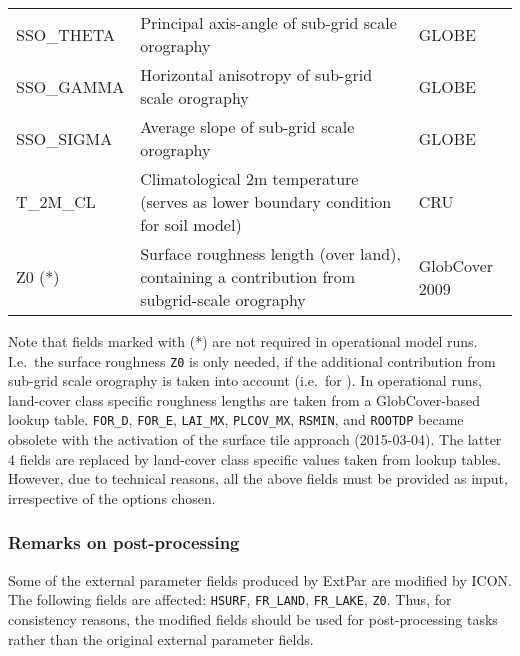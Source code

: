 \begin{longtable}{p{2.5cm}p{8.5cm}p{3.3cm}}
  SSO\_THETA                            & Principal axis-angle of sub-grid scale orography &          GLOBE           \\
  SSO\_GAMMA                            & Horizontal anisotropy of sub-grid scale orography &         GLOBE           \\
  SSO\_SIGMA                            & Average slope of sub-grid scale orography       &           GLOBE           \\
  T\_2M\_CL                             & Climatological 2m temperature (serves as lower boundary condition for soil model)  &  CRU \\
  Z0 (*)                                & Surface roughness length (over land), containing a contribution from subgrid-scale orography  & GlobCover 2009    \\                        
  \bottomrule
\end{longtable}

Note that fields marked with (*) are not required in operational model runs. I.e.\ the surface roughness \texttt{Z0} is only needed, 
if the additional contribution from sub-grid scale orography is taken into account (i.e.\ for ). In operational runs, land-cover 
class specific roughness lengths are taken from a GlobCover-based lookup table. \texttt{FOR\_D}, \texttt{FOR\_E}, \texttt{LAI\_MX}, \texttt{PLCOV\_MX}, 
\texttt{RSMIN}, and \texttt{ROOTDP} became obsolete with the activation of the surface tile approach (2015-03-04). The latter $4$ fields 
are replaced by land-cover class specific values taken from lookup tables. However, due to technical reasons, all the above fields must be 
provided as input, irrespective of the options chosen.



\subsubsection*{Remarks on post-processing}
Some of the external parameter fields produced by ExtPar are modified by ICON. The following fields are affected: \texttt{HSURF}, 
\texttt{FR\_LAND}, \texttt{FR\_LAKE}, \texttt{Z0}. Thus, for consistency reasons, the modified fields should be used for post-processing tasks 
rather than the original external parameter fields.
